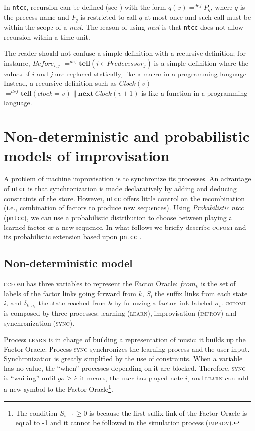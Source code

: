 \documentclass[english]{llncs}
\begin{document}
In \texttt{ntcc}, recursion can be defined (see \cite{cc-chapter}) with the form $q(x) =^{def} P_q$, where $q$ is the process name and
$P_q$ is restricted to call $q$ at most once and such call must be within the scope of a \textit{next}.
The reason of using \textit{next} is that \texttt{ntcc} does not allow 
recursion within a time unit.

The reader should not confuse a simple definition with a recursive definition; for instance, $Before_{i,j}$ $=^{def} \textbf{tell} (i \in Predecessor_j)$ is a simple
definition where the values of $i$ and $j$ are replaced statically, like a macro in a programming language.
Instead, a recursive definition such as $Clock(v)$ $=^{def} \textbf{tell} (clock=v) \| \textbf{next}\ Clock(v+1) $
is like 
a function in a programming language.


\section{Non-deterministic and probabilistic models of improvisation}
A problem of machine improvisation is to synchronize its processes. An advantage of \texttt{ntcc} is that synchronization is made declaratively by adding and deducing constraints of the store. However, \texttt{ntcc} offers little control on the recombination (i.e., combination of factors to produce new sequences). Using \textit{Probabilistic ntcc} (\texttt{pntcc}), we can use a probabilistic distribution to choose between playing a learned factor or a new sequence. In what follows we briefly describe \textsc{ccfomi} and its probabilistic extension based upon \texttt{pntcc} \cite{perez09}.



\subsection{Non-deterministic model}
\textsc{ccfomi} has three variables to represent the Factor Oracle:   $from_{k}$ is the set of labels of the 
factor links going forward from $k$, $S_{i}$ the suffix links
 from each state $i$, and  $\delta_{k,\sigma_{i}}$ the state reached from $k$
 by following a factor link labeled $\sigma_{i}$. \textsc{ccfomi} is composed by three processes: learning (\textsc{learn}), improvisation (\textsc{improv}) and synchronization (\textsc{sync}).



Process \textsc{learn} is in charge of building a representation of music: it builds up the Factor Oracle.
Process \textsc{sync} synchronizes the learning process and the user input. 
Synchronization is greatly simplified by the use of constraints. When a variable has no value, the ``when'' processes depending on it are blocked. Therefore,  \textsc{sync} is ``waiting'' until $go \geq i$: it means, the user has played note $i$, and \textsc{learn} can add a new symbol to the Factor Oracle\footnote{The condition $S_{i-1} \geq 0 $ is because the first suffix link of the Factor Oracle is equal to -1 and it cannot be followed in the simulation process (\textsc{improv}).}.  \\
\end{document}

